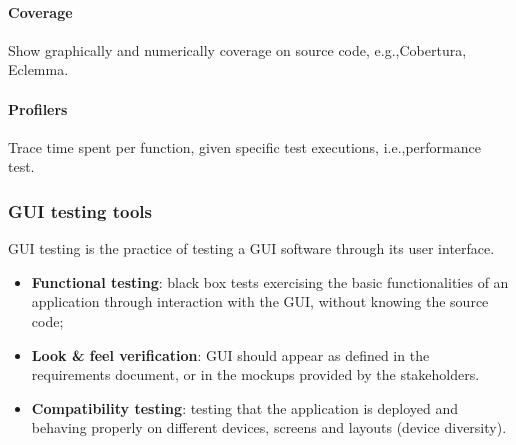 \paragraph{Coverage}
Show graphically and numerically coverage on source code, e.g.,\@ Cobertura, Eclemma.

\paragraph{Profilers}
Trace time spent per function, given specific test executions, i.e.,\@ performance test.

\subsubsection{GUI testing tools}
GUI testing is the practice of testing a GUI software through its user interface.
\begin{itemize}
\item \textbf{Functional testing}: black box tests exercising the basic functionalities of an application through interaction with the GUI, without knowing the source code;
\item \textbf{Look \& feel verification}: GUI should appear as defined in the requirements document, or in the mockups provided by the stakeholders.
\item \textbf{Compatibility testing}: testing that the application is deployed and behaving properly on different devices, screens and layouts (device diversity).
\end{itemize}

